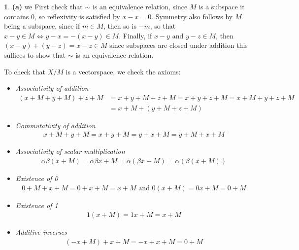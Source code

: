 \documentclass[10.5pt]{article}
\theoremstyle{definition}
\newtheorem{pb}{}
\newcommand{\tand}{\text{ and }}
\begin{document}
        \begin{pb}
            \textbf{(a)} we First check that \(\sim\) is an equivalence relation, since \(M\) is a subspace it contains \(0\), so reflexivity is satisfied by \(x-x = 0\). Symmetry also follows by \(M\) being a subspace, since if \(m \in M\), then so is \(-m\), so that \(x-y \in M \iff y-x = -(x-y) \in M\). Finally, if \(x-y \tand y-z \in M\), then \((x-y) + (y-z) = x-z \in M\) since subspaces are closed under addition this suffices to show that \(\sim\) is an equivalence relation.

            To check that \(X/M\) is a vectorspace, we check the axioms:

            \begin{itemize}
                \item \emph{Associativity of addition}
                \begin{align*}
                    (x + M + y + M) + z + M &= x + y + M + z + M = x + y + z + M = x + M + y + z + M \\
                    &= x + M + (y + M + z + M)
                \end{align*}
                \item \emph{Commutativity of addition}
                \begin{align*}
                    x + M + y + M = x + y + M = y + x + M = y + M + x + M
                \end{align*}
                \item \emph{Associativity of scalar multiplication}
                \begin{align*}
                    \alpha \beta (x + M) = \alpha \beta x + M = \alpha(\beta x + M) = \alpha(\beta(x + M))
                \end{align*}
                \item \emph{Existence of 0}
                \begin{align*}
                    0 + M + x + M = 0 + x + M = x + M \tand 0(x + M) = 0x + M = 0 + M
                \end{align*}
                \item \emph{Existence of 1}
                \begin{align*}
                    1(x + M) = 1x + M = x + M
                \end{align*}
                \item \emph{Additive inverses}
                \begin{align*}
                    (-x + M) + x + M = -x + x + M = 0 + M

\end{align*}
\end{itemize}
\end{pb}
\end{document}
